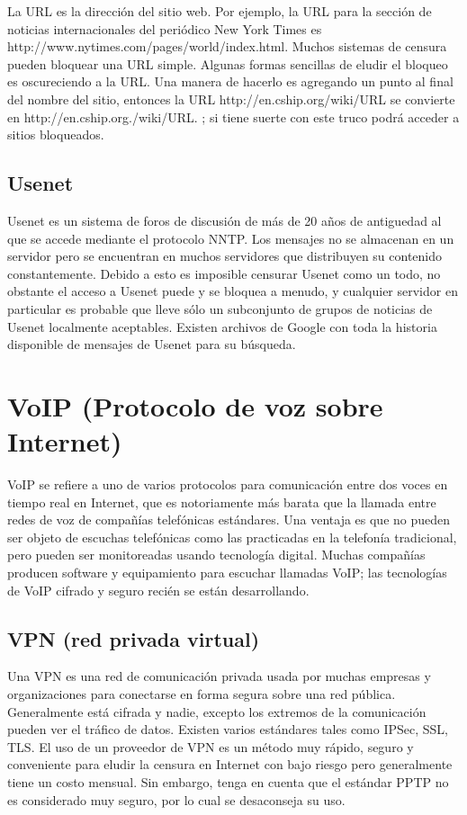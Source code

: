 La URL es la dirección del sitio web. Por ejemplo, la URL para la
sección de noticias internacionales del periódico New York Times es
http://www.nytimes.com/pages/world/index.html. Muchos sistemas de
censura pueden bloquear una URL simple. Algunas formas sencillas de
eludir el bloqueo es oscureciendo a la URL. Una manera de hacerlo es
agregando un punto al final del nombre del sitio, entonces la URL
http://en.cship.org/wiki/URL se convierte en
http://en.cship.org./wiki/URL. ; si tiene suerte con este truco podrá
acceder a sitios bloqueados.

\subsection{Usenet}\label{usenet}

Usenet es un sistema de foros de discusión de más de 20 años de
antiguedad al que se accede mediante el protocolo NNTP. Los mensajes no
se almacenan en un servidor pero se encuentran en muchos servidores que
distribuyen su contenido constantemente. Debido a esto es imposible
censurar Usenet como un todo, no obstante el acceso a Usenet puede y se
bloquea a menudo, y cualquier servidor en particular es probable que
lleve sólo un subconjunto de grupos de noticias de Usenet localmente
aceptables. Existen archivos de Google con toda la historia disponible
de mensajes de Usenet para su búsqueda.

\section{VoIP (Protocolo de voz sobre
Internet)}\label{voip-protocolo-de-voz-sobre-internet}

VoIP se refiere a uno de varios protocolos para comunicación entre dos
voces en tiempo real en Internet, que es notoriamente más barata que la
llamada entre redes de voz de compañías telefónicas estándares. Una
ventaja es que no pueden ser objeto de escuchas telefónicas como las
practicadas en la telefonía tradicional, pero pueden ser monitoreadas
usando tecnología digital. Muchas compañías producen software y
equipamiento para escuchar llamadas VoIP; las tecnologías de VoIP
cifrado y seguro recién se están desarrollando.

\subsection{VPN (red privada virtual)}\label{vpn-red-privada-virtual}

Una VPN es una red de comunicación privada usada por muchas empresas y
organizaciones para conectarse en forma segura sobre una red pública.
Generalmente está cifrada y nadie, excepto los extremos de la
comunicación pueden ver el tráfico de datos. Existen varios estándares
tales como IPSec, SSL, TLS. El uso de un proveedor de VPN es un método
muy rápido, seguro y conveniente para eludir la censura en Internet con
bajo riesgo pero generalmente tiene un costo mensual. Sin embargo, tenga
en cuenta que el estándar PPTP no es considerado muy seguro, por lo cual
se desaconseja su uso.

